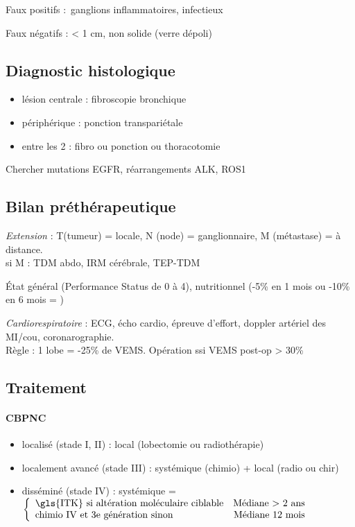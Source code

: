 Faux positifs : ganglions inflammatoires, infectieux

Faux négatifs : < 1 cm, non solide (verre dépoli)

\subsection{Diagnostic histologique}
\begin{itemize}
\item lésion centrale : fibroscopie bronchique
\item périphérique : ponction transpariétale
\item entre les 2 : fibro ou ponction ou thoracotomie
\end{itemize}
Chercher mutations EGFR, réarrangements ALK, ROS1

\subsection{Bilan préthérapeutique}
\textit{Extension}  : T(tumeur) = locale, N (node) = ganglionnaire, M
(métastase) = à distance. \\
si M : TDM abdo, IRM cérébrale, TEP-TDM

État général (Performance Status de 0 à 4), nutritionnel (-5\% en 1 mois ou
-10\% en 6 mois = \frownie{})

\textit{Cardiorespiratoire} : ECG, écho cardio, épreuve d'effort, doppler artériel des MI/cou,
coronarographie.\\
Règle : 1 lobe = -25\% de VEMS. Opération ssi VEMS post-op > 30\%
\subsection{Traitement}
\paragraph{CBPNC}
\begin{itemize}
\item localisé (stade I, II) : local (lobectomie ou radiothérapie)
\item localement avancé (stade III) : systémique (chimio) + local (radio ou
  chir)
\item disséminé (stade IV) : systémique = 
  $\left \{
    \begin{array}{lr}
      \text{\gls{ITK} si altération moléculaire ciblable} & \text{Médiane > 2 ans}\\
      \text{chimio IV et 3e génération sinon} & \text{Médiane 12 mois}\\
    \end{array}
  \right.$
\end{itemize}
